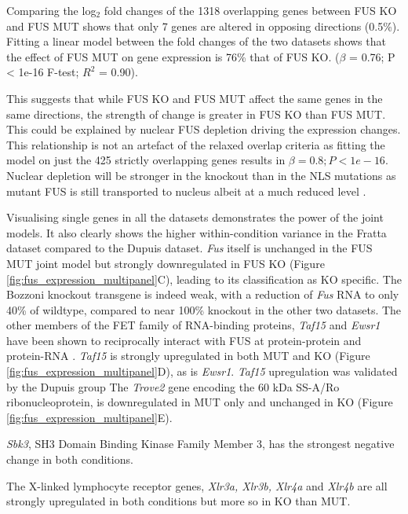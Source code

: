 Comparing the log$_2$ fold changes of the 1318 overlapping genes between FUS KO and FUS MUT shows that only 7 genes are altered in opposing directions (0.5\%).
Fitting a linear model between the fold changes of the two datasets shows that the effect of FUS MUT on gene expression is 76\% that of FUS KO.  ($\beta$ = 0.76; P < 1e-16 F-test; $R^2$ = 0.90).

This suggests that while FUS KO and FUS MUT affect the same genes in the same directions, the strength of change is greater in FUS KO than FUS MUT. 
This could be explained by nuclear FUS depletion driving the expression changes.
This relationship is not an artefact of the relaxed overlap criteria as fitting the model on just the 425 strictly overlapping genes results in $\beta = 0.8; P < 1e-16$. %
Nuclear depletion will be stronger in the knockout than in the NLS mutations as mutant FUS is still transported to nucleus albeit at a much reduced level \citep{Devoy2017, Scekic-zahirovic2016}.

Visualising single genes in all the datasets demonstrates the power of the joint models.
It also clearly shows the higher within-condition variance in the Fratta dataset compared to the Dupuis dataset.
\textit{Fus} itself is unchanged in the FUS MUT joint model  but strongly downregulated in FUS KO (Figure \ref{fig:fus_expression_multipanel}C), leading to its classification as KO specific.
The Bozzoni knockout transgene is indeed weak, with a reduction of \textit{Fus} RNA to only 40\% of wildtype, compared to near 100\% knockout in the other two datasets.
The other members of the FET family of RNA-binding proteins,  \textit{Taf15} and \textit{Ewsr1} have been shown to reciprocally interact with FUS at protein-protein  \citep{Kapeli2016} and protein-RNA \citep{Lagier-Tourenne2012}.
\textit{Taf15} is strongly upregulated in both MUT and KO (Figure \ref{fig:fus_expression_multipanel}D), as is \textit{Ewsr1}.  \textit{Taf15} upregulation was validated by the Dupuis group  \citep{Scekic-zahirovic2016} %
The \textit{Trove2} gene encoding the 60 kDa SS-A/Ro ribonucleoprotein,  is downregulated in MUT only and unchanged in KO (Figure \ref{fig:fus_expression_multipanel}E).

\textit{Sbk3}, SH3 Domain Binding Kinase Family Member 3, has the strongest negative change in both conditions. %

The X-linked lymphocyte receptor genes, \textit{Xlr3a, Xlr3b, Xlr4a} and \textit{Xlr4b} are all strongly upregulated in both conditions but more so in KO than MUT. 


